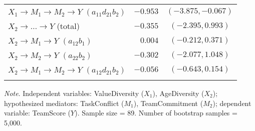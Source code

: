 \documentclass{article}\usepackage[]{graphicx}\usepackage[]{xcolor}
\begin{document}
\begin{table}[h!]
\begin{center}
\begin{tabular}{lrrrr}
$X_{1} \rightarrow M_{1} \rightarrow M_{2} \rightarrow Y$ $(a_{11}d_{21}b_{2})$ & $-0.953$ & \multicolumn{3}{c}{$(-3.875, -0.067)$} \\ 
$X_{2} \rightarrow  \ldots  \rightarrow Y$ (total) & $-0.355$ & \multicolumn{3}{c}{$(-2.395,  0.993)$} \\ 
$X_{2} \rightarrow M_{1} \rightarrow Y$ $(a_{12}b_{1})$ & $ 0.004$ & \multicolumn{3}{c}{$(-0.212,  0.371)$} \\ 
$X_{2} \rightarrow M_{2} \rightarrow Y$ $(a_{22}b_{2})$ & $-0.302$ & \multicolumn{3}{c}{$(-2.077,  1.048)$} \\ 
$X_{2} \rightarrow M_{1} \rightarrow M_{2} \rightarrow Y$ $(a_{12}d_{21}b_{2})$ & $-0.056$ & \multicolumn{3}{c}{$(-0.643,  0.154)$} \\ 
\noalign{\smallskip}\hline
\end{tabular}
\end{center}
\emph{Note}. Independent variables: ValueDiversity ($X_{1}$), AgeDiversity ($X_{2}$); hypothesized mediators: TaskConflict ($M_{1}$), TeamCommitment ($M_{2}$); dependent variable: TeamScore ($Y$). Sample size = 89. Number of bootstrap samples = 5,000. 

\end{table}
\end{document}
